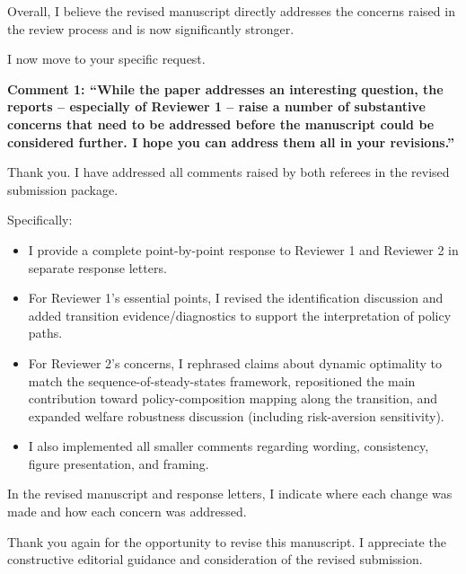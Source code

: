 \documentclass[12pt]{article}
\begin{document}
\begin{onehalfspacing}
Overall, I believe the revised manuscript directly addresses the concerns raised in the review process and is now significantly stronger.

I now move to your specific request.

\bigskip
\bigskip

\textbf{Comment 1: ``While the paper addresses an interesting question, the reports -- especially of Reviewer 1 -- raise a number of substantive concerns that need to be addressed before the manuscript could be considered further. I hope you can address them all in your revisions.''}

\medskip

Thank you. I have addressed all comments raised by both referees in the revised submission package.

Specifically:
\begin{itemize}
\item I provide a complete point-by-point response to Reviewer 1 and Reviewer 2 in separate response letters.
\item For Reviewer 1's essential points, I revised the identification discussion and added transition evidence/diagnostics to support the interpretation of policy paths.
\item For Reviewer 2's concerns, I rephrased claims about dynamic optimality to match the sequence-of-steady-states framework, repositioned the main contribution toward policy-composition mapping along the transition, and expanded welfare robustness discussion (including risk-aversion sensitivity).
\item I also implemented all smaller comments regarding wording, consistency, figure presentation, and framing.
\end{itemize}

In the revised manuscript and response letters, I indicate where each change was made and how each concern was addressed.

\bigskip

Thank you again for the opportunity to revise this manuscript. I appreciate the constructive editorial guidance and consideration of the revised submission.

\end{onehalfspacing}
\end{document}
